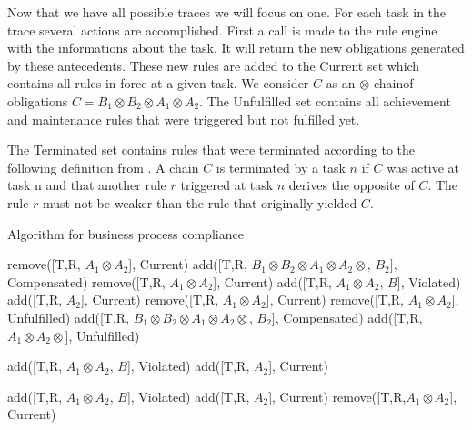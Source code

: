 \documentclass[10pt]{report}
\newcommand{\ochain}{$\otimes$-chain}
\begin{document}
Now that we have all possible traces we will focus on one. For each task in the trace several actions are accomplished. First a call is made to the rule engine with the informations about the task. It will return the new obligations generated by these antecedents. These new rules are added to the Current set which contains all rules in-force at a given task. We consider $C$ as an \ochain of obligations $C= B_{1} \otimes B_{2} \otimes A_{1} \otimes A_{2}$. The Unfulfilled set contains all achievement and maintenance rules that were triggered but not fulfilled yet.

The Terminated set contains rules that were terminated according to the following definition from \autocite{ConceptuallyRichModelofBPC}. A chain $C$ is terminated by a task $n$ if $C$ was active at task n and that another rule $r$ triggered at task $n$ derives the opposite of $C$. The rule $r$ must not be weaker than the rule that originally yielded $C$.

\begin{algorithm}
\caption{Algorithm for business process compliance \autocite{ConceptuallyRichModelofBPC}}
\begin{algorithmic}
			\State remove([T,R, $A_{1} \otimes A_{2}$], Current)
				\State add([T,R, $B_{1} \otimes B_{2} \otimes A_{1} \otimes A_{2} \otimes$, $B_{2}]$, Compensated)
			\EndIf
		\Else 
			\State remove([T,R, $A_{1} \otimes A_{2} $], Current)
			\State add([T,R, $A_{1} \otimes A_{2}$, $B$], Violated)
			\State add([T,R, $A_{2}$], Current)
		\EndIf
	\EndIf
			\State remove([T,R, $A_{1} \otimes A_{2}$], Current)
			\State remove([T,R, $A_{1} \otimes A_{2}$], Unfulfilled)
				\State add([T,R, $B_{1} \otimes B_{2} \otimes A_{1} \otimes A_{2} \otimes$, $B_{2}]$, Compensated)
			\EndIf
		\Else
			\State add([T,R, $A_{1} \otimes A_{2} \otimes$], Unfulfilled)
		\EndIf
	\EndIf
	
			\State add([T,R, $A_{1} \otimes A_{2}$, $B$], Violated)
			\State add([T,R, $A_{2}$], Current)
		\EndIf
	\EndIf
\EndFor

\State

		\State add([T,R, $A_{1} \otimes A_{2}$, $B$], Violated)
		\State add([T,R, $A_{2}$], Current)
	\EndIf
		\State remove([T,R,$A_{1} \otimes A_{2}$], Current)
	\EndIf
\EndFor
\end{algorithmic}
\end{algorithm}
\end{document}
